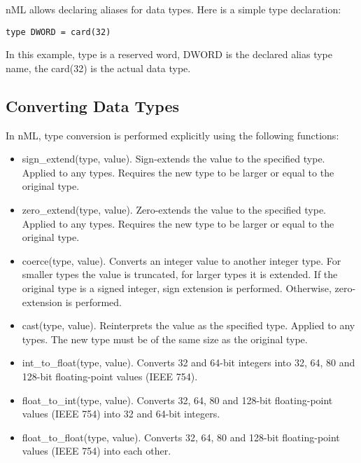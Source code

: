 \documentclass[oneside,final,14pt]{extreport}
\begin{document}
nML allows declaring aliases for data types. Here is a simple type declaration:

\begin{lstlisting}
type DWORD = card(32)
\end{lstlisting}

In this example, type is a reserved word, DWORD is the declared alias type name, the card(32) is
the actual data type.

\subsection{Converting Data Types}

In nML, type conversion is performed explicitly using the following functions:

\begin{itemize}
\item sign{\_}extend(type, value).
Sign-extends the value to the specified type. Applied to any types. Requires
the new type to be larger or equal to the original type.

\item zero{\_}extend(type, value).
Zero-extends the value to the specified type. Applied to any types. Requires the new type to be larger or equal to the original type.

\item coerce(type, value).
Converts an integer value to another integer type. For smaller types the value is truncated, for larger types it is extended. If the original type is a signed integer, sign extension is performed. Otherwise, zero-extension is performed.

\item cast(type, value).
Reinterprets the value as the specified type. Applied to any types. The new type must be of the same size as the original type.

\item int{\_}to{\_}float(type, value).
Converts 32 and 64-bit integers into 32, 64, 80 and 128-bit floating-point values (IEEE 754).

\item float{\_}to{\_}int(type, value).
Converts 32, 64, 80 and 128-bit floating-point values (IEEE 754) into 32 and 64-bit integers.

\item float{\_}to{\_}float(type, value).
Converts 32, 64, 80 and 128-bit floating-point values (IEEE 754) into each other.

\end{itemize}
\end{document}
